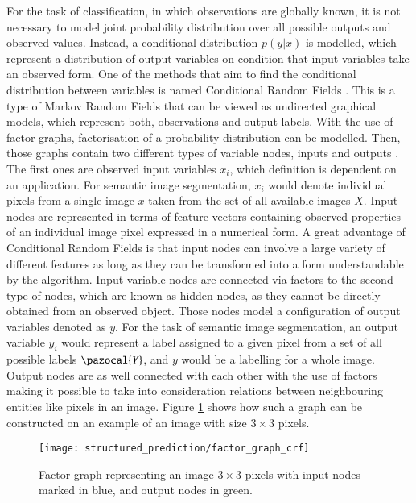 For the task of classification, in which observations are globally known, it is not necessary to model joint probability distribution over all possible outputs and observed values. Instead, a conditional distribution $p(y|x)$ is modelled, which represent a distribution of output variables on condition that input variables take an observed form. One of the methods that aim to find the conditional distribution between variables is named Conditional Random Fields \cite{crf_lafferty}. This is a type of Markov Random Fields that can be viewed as undirected graphical models, which represent both, observations and output labels. With the use of factor graphs, factorisation of a probability distribution can be modelled. Then, those graphs contain two different types of variable nodes, inputs and outputs \cite{crf_sutton}. The first ones are observed input variables $x_i$, which definition is dependent on an application. For semantic image segmentation, $x_i$ would denote individual pixels from a single image $x$ taken from the set of all available images $X$. Input nodes are represented in terms of feature vectors containing observed properties of an individual image pixel expressed in a numerical form. A great advantage of Conditional Random Fields is that input nodes can involve a large variety of different features as long as they can be transformed into a form understandable by the algorithm. Input variable nodes are connected via factors to the second type of nodes, which are known as hidden nodes, as they cannot be directly obtained from an observed object. Those nodes model a configuration of output variables denoted as $y$. For the task of semantic image segmentation, an output variable $y_i$ would represent a label assigned to a given pixel from a set of all possible labels $\pazocal{Y}$, and $y$ would be a labelling for a whole image. Output nodes are as well connected with each other with the use of factors making it possible to take into consideration relations between neighbouring entities like pixels in an image. Figure \ref{fig:factor_graph_crf} shows how such a graph can be constructed on an example of an image with size $3\times3$ pixels.
\begin{figure}[ht]
    \centering
    \texttt{[image: structured\_prediction/factor\_graph\_crf]}
    \caption[Factor graph representing an image $3\times3$ pixels.]{Factor graph representing an image $3\times3$ pixels with input nodes marked in blue, and output nodes in green.}
     \label{fig:factor_graph_crf}
\end{figure}

